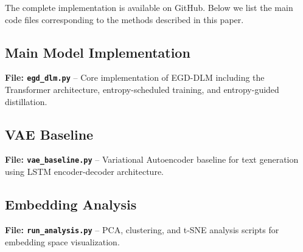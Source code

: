 \documentclass[conference]{IEEEtran}
\begin{document}
The complete implementation is available on GitHub. Below we list the main code files corresponding to the methods described in this paper.


\subsection{Main Model Implementation}

\textbf{File: \texttt{egd\_dlm.py}} -- Core implementation of EGD-DLM including the Transformer architecture, entropy-scheduled training, and entropy-guided distillation.



\subsection{VAE Baseline}

\textbf{File: \texttt{vae\_baseline.py}} -- Variational Autoencoder baseline for text generation using LSTM encoder-decoder architecture.



\subsection{Embedding Analysis}

\textbf{File: \texttt{run\_analysis.py}} -- PCA, clustering, and t-SNE analysis scripts for embedding space visualization.


\end{document}
